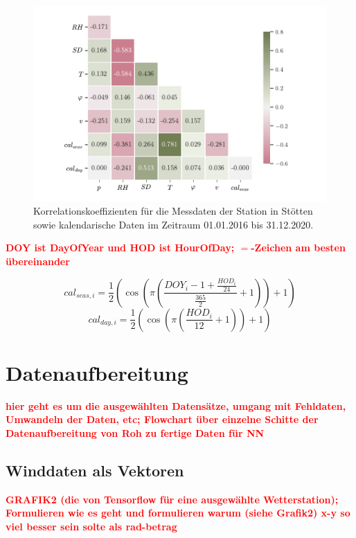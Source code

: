 \documentclass[
12pt, %
toc=listofnumbered, %
toc=chapterentrydotfill, %
numbers=noenddot, %
captions=tableheading, %
]{scrreprt}
\let\Oldsection\section
\renewcommand{\section}{\FloatBarrier\Oldsection}
\let\Oldsubsection\subsection
\renewcommand{\subsection}{\FloatBarrier\Oldsubsection}
\newcommand{\highlight}[1]{\textbf{\textcolor{red}{#1}}}
\begin{document}
\begin{figure}[tph]
	\begin{center}
		\includegraphics[]{./images/corr.pdf}
		\caption{Korrelationskoeffizienten für die Messdaten der Station in Stötten sowie kalendarische Daten im Zeitraum 01.01.2016 bis 31.12.2020.}
		\label{fig:corr}
	\end{center}
\end{figure}

\highlight{DOY ist DayOfYear und HOD ist HourOfDay; $=$-Zeichen am besten übereinander}

\begin{equation}
	\label{eq:cal_seas}
	cal_{seas,i} = \frac{1}{2}(\cos(\pi (\frac{DOY_i -1 + \frac{HOD_i}{24}}{\frac{365}{2}}+ 1)) + 1)
\end{equation}
\begin{equation}
	\label{eq:cal_day}
	cal_{day,i} = \frac{1}{2}(\cos(\pi (\frac{HOD_i}{12}+ 1)) + 1)
\end{equation}

\section{Datenaufbereitung}
\highlight{hier geht es um die ausgewählten Datensätze, umgang mit Fehldaten, 
Umwandeln der Daten, etc;  
Flowchart über einzelne Schitte der Datenaufbereitung von Roh zu fertige Daten für NN}

\subsection{Winddaten als Vektoren}
\highlight{GRAFIK2 (die von Tensorflow für eine ausgewählte Wetterstation); 
Formulieren wie es geht und formulieren warum (siehe Grafik2) x-y so viel besser sein solte als rad-betrag}
\end{document}
